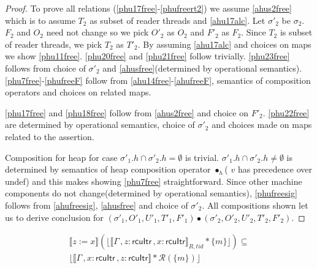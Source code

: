 \begin{proof}
To prove all relations (\ref{phu17free}-\ref{phufreert2}) we assume \ref{ahus2free} which is to assume $T_2$ as subset of reader threads and \ref{ahu17alc}. Let $\sigma'_2$ be $\sigma_2$. $F_2$ and $O_2$ need not change so we pick $O'_2$  as $O_2$ and $F'_2$ as $F_2$. Since $T_2$ is subset of reader threads, we pick $T_2$ as  $T'_2$. By assuming \ref{ahu17alc} and choices on maps we show \ref{phu11free}. \ref{phu20free} and \ref{phu21free} follow trivially. \ref{phu23free} follows from choice of $\sigma'_2$ and \ref{ahusfree}(determined by operational semantics). \ref{phu7free}-\ref{phufreeF} follow from \ref{ahu14free}-\ref{ahufreeF}, semantics of composition operators and choices on related maps.

\ref{phu17free} and \ref{phu18free} follow from \ref{ahus2free} and choice on $F'_2$. \ref{phu22free} are determined by operational semantics, choice of $\sigma'_2$ and choices made on maps related to the assertion.

Composition for heap for case $\sigma'_1.h \cap \sigma'_2.h = \emptyset$ is trivial. $\sigma'_1.h \cap \sigma'_2.h \neq \emptyset$ is determined by semantics of heap composition operator $\bullet_h$( $v$ has precedence over \textsf{undef}) and this makes showing \ref{phu7free} straightforward. Since other machine components do not change(determined by operational semantics), \ref{phufreesig} follows from \ref{ahufreesig}, \ref{ahusfree} and choice of $\sigma'_2$. All compositions shown let us to derive conclusion for  $(\sigma'_1, O'_1, U'_1, T'_1,F'_1) \bullet (\sigma'_2, O'_2, U'_2, T'_2,F'_2) $.
 \end{proof} 
  \begin{lemma}
   \label{lemma:rreadstack}
\begin{align*}
  \llbracket z:=x \rrbracket (\lfloor \llbracket \Gamma\,, z:\textsf{rcuItr}\, , x:\textsf{rcuItr} \rrbracket_{R,tid} * \{m\}\rfloor)  \subseteq \\
                                                              \lfloor \llbracket \Gamma\,, x:\textsf{rcuItr} \, , z:\textsf{rcuItr}  \rrbracket  * \mathcal{R}(\{m\})\rfloor
\end{align*}
 \end{lemma}
